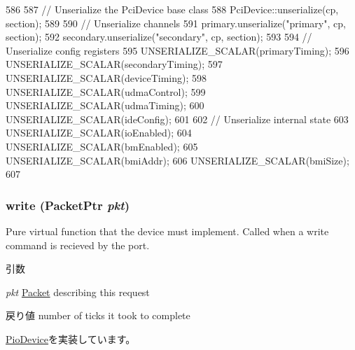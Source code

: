 \begin{DoxyCode}
586 {
587     // Unserialize the PciDevice base class
588     PciDevice::unserialize(cp, section);
589 
590     // Unserialize channels
591     primary.unserialize("primary", cp, section);
592     secondary.unserialize("secondary", cp, section);
593 
594     // Unserialize config registers
595     UNSERIALIZE_SCALAR(primaryTiming);
596     UNSERIALIZE_SCALAR(secondaryTiming);
597     UNSERIALIZE_SCALAR(deviceTiming);
598     UNSERIALIZE_SCALAR(udmaControl);
599     UNSERIALIZE_SCALAR(udmaTiming);
600     UNSERIALIZE_SCALAR(ideConfig);
601 
602     // Unserialize internal state
603     UNSERIALIZE_SCALAR(ioEnabled);
604     UNSERIALIZE_SCALAR(bmEnabled);
605     UNSERIALIZE_SCALAR(bmiAddr);
606     UNSERIALIZE_SCALAR(bmiSize);
607 }
\end{DoxyCode}
\hypertarget{classIdeController_a4cefab464e72b5dd42c003a0a4341802}{
\subsubsection[{write}]{ write ({\bf PacketPtr} {\em pkt})}}
\label{classIdeController_a4cefab464e72b5dd42c003a0a4341802}
Pure virtual function that the device must implement. Called when a write command is recieved by the port. 
\begin{DoxyParams}{引数}
\item[{\em pkt}]\hyperlink{classPacket}{Packet} describing this request \end{DoxyParams}
\begin{DoxyReturn}{戻り値}
number of ticks it took to complete 
\end{DoxyReturn}


\hyperlink{classPioDevice_afe8371668d023bb2516b286e5e399b6f}{PioDevice}を実装しています。


